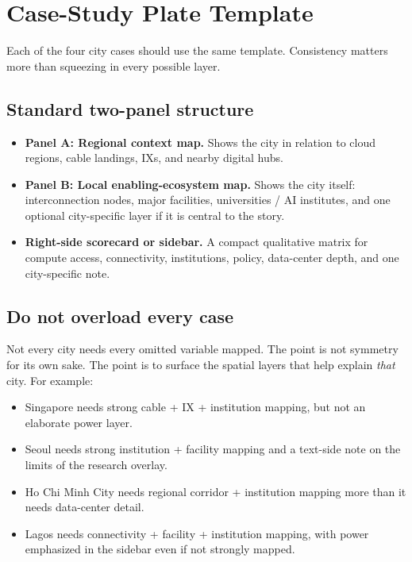 \documentclass[11pt]{article}
\begin{document}
\section{Case-Study Plate Template}

Each of the four city cases should use the same template. Consistency matters more than squeezing in every possible layer.

\subsection{Standard two-panel structure}
\begin{itemize}[leftmargin=1.4em,itemsep=0.25em]
    \item \textbf{Panel A: Regional context map.} Shows the city in relation to cloud regions, cable landings, IXs, and nearby digital hubs.
    \item \textbf{Panel B: Local enabling-ecosystem map.} Shows the city itself: interconnection nodes, major facilities, universities / AI institutes, and one optional city-specific layer if it is central to the story.
    \item \textbf{Right-side scorecard or sidebar.} A compact qualitative matrix for compute access, connectivity, institutions, policy, data-center depth, and one city-specific note.
\end{itemize}

\subsection{Do not overload every case}
Not every city needs every omitted variable mapped. The point is not symmetry for its own sake. The point is to surface the spatial layers that help explain \emph{that} city. For example:
\begin{itemize}[leftmargin=1.4em,itemsep=0.25em]
    \item Singapore needs strong cable + IX + institution mapping, but not an elaborate power layer.
    \item Seoul needs strong institution + facility mapping and a text-side note on the limits of the research overlay.
    \item Ho Chi Minh City needs regional corridor + institution mapping more than it needs data-center detail.
    \item Lagos needs connectivity + facility + institution mapping, with power emphasized in the sidebar even if not strongly mapped.
\end{itemize}
\end{document}
